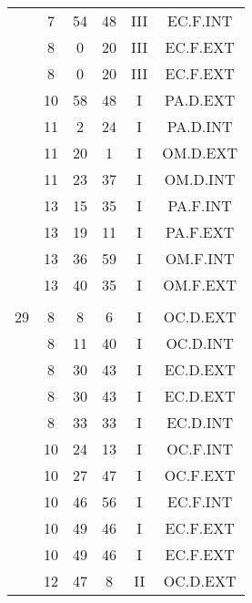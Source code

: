 \documentclass[12pt, a4paper]{article}
\begin{document}
\begin{multicols}{3}
{\begin{tabular}{c c c c c c}
	 	 	 	 & 7 & 54 & 48 & III & EC.F.INT\\%
	 	 	 	 & 8 & 0 & 20 & III & EC.F.EXT\\%
	 	 	 	 & 8 & 0 & 20 & III & EC.F.EXT\\%
	 	 	 	 & 10 & 58 & 48 & I & PA.D.EXT\\%
	 	 	 	 & 11 & 2 & 24 & I & PA.D.INT\\%
	 	 	 	 & 11 & 20 & 1 & I & OM.D.EXT\\%
	 	 	 	 & 11 & 23 & 37 & I & OM.D.INT\\%
	 	 	 	 & 13 & 15 & 35 & I & PA.F.INT\\%
	 	 	 	 & 13 & 19 & 11 & I & PA.F.EXT\\%
	 	 	 	 & 13 & 36 & 59 & I & OM.F.INT\\%
	 	 	 	 & 13 & 40 & 35 & I & OM.F.EXT\\%
	 	 	 	 & & & & & \\%
	 	 	 	29 & 8 & 8 & 6 & I & OC.D.EXT\\%
	 	 	 	 & 8 & 11 & 40 & I & OC.D.INT\\%
	 	 	 	 & 8 & 30 & 43 & I & EC.D.EXT\\%
	 	 	 	 & 8 & 30 & 43 & I & EC.D.EXT\\%
	 	 	 	 & 8 & 33 & 33 & I & EC.D.INT\\%
	 	 	 	 & 10 & 24 & 13 & I & OC.F.INT\\%
	 	 	 	 & 10 & 27 & 47 & I & OC.F.EXT\\%
	 	 	 	 & 10 & 46 & 56 & I & EC.F.INT\\%
	 	 	 	 & 10 & 49 & 46 & I & EC.F.EXT\\%
	 	 	 	 & 10 & 49 & 46 & I & EC.F.EXT\\%
	 	 	 	 & 12 & 47 & 8 & II & OC.D.EXT\\%

\end{tabular}}
\end{multicols}
\end{document}
